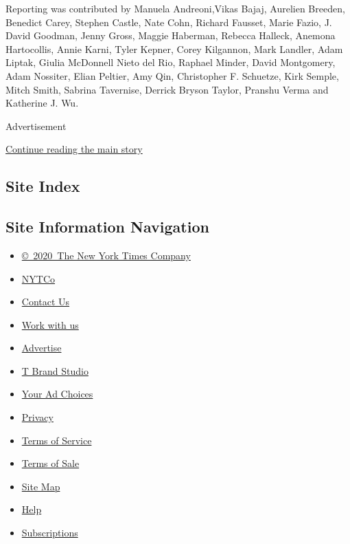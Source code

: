 Reporting was contributed by Manuela Andreoni,Vikas Bajaj, Aurelien
Breeden, Benedict Carey, Stephen Castle, Nate Cohn, Richard Fausset,
Marie Fazio, J. David Goodman, Jenny Gross, Maggie Haberman, Rebecca
Halleck, Anemona Hartocollis, Annie Karni, Tyler Kepner, Corey
Kilgannon, Mark Landler, Adam Liptak, Giulia McDonnell Nieto del Rio,
Raphael Minder, David Montgomery, Adam Nossiter, Elian Peltier, Amy Qin,
Christopher F. Schuetze, Kirk Semple, Mitch Smith, Sabrina Tavernise,
Derrick Bryson Taylor, Pranshu Verma and Katherine J. Wu.

Advertisement

\protect\hyperlink{after-bottom}{Continue reading the main story}

\hypertarget{site-index}{%
\subsection{Site Index}\label{site-index}}

\hypertarget{site-information-navigation}{%
\subsection{Site Information
Navigation}\label{site-information-navigation}}

\begin{itemize}
\tightlist
\item
  \href{https://help.nytimes3xbfgragh.onion/hc/en-us/articles/115014792127-Copyright-notice}{©~2020~The
  New York Times Company}
\end{itemize}

\begin{itemize}
\tightlist
\item
  \href{https://www.nytco.com/}{NYTCo}
\item
  \href{https://help.nytimes3xbfgragh.onion/hc/en-us/articles/115015385887-Contact-Us}{Contact
  Us}
\item
  \href{https://www.nytco.com/careers/}{Work with us}
\item
  \href{https://nytmediakit.com/}{Advertise}
\item
  \href{http://www.tbrandstudio.com/}{T Brand Studio}
\item
  \href{https://www.nytimes3xbfgragh.onion/privacy/cookie-policy\#how-do-i-manage-trackers}{Your
  Ad Choices}
\item
  \href{https://www.nytimes3xbfgragh.onion/privacy}{Privacy}
\item
  \href{https://help.nytimes3xbfgragh.onion/hc/en-us/articles/115014893428-Terms-of-service}{Terms
  of Service}
\item
  \href{https://help.nytimes3xbfgragh.onion/hc/en-us/articles/115014893968-Terms-of-sale}{Terms
  of Sale}
\item
  \href{https://spiderbites.nytimes3xbfgragh.onion}{Site Map}
\item
  \href{https://help.nytimes3xbfgragh.onion/hc/en-us}{Help}
\item
  \href{https://www.nytimes3xbfgragh.onion/subscription?campaignId=37WXW}{Subscriptions}
\end{itemize}

